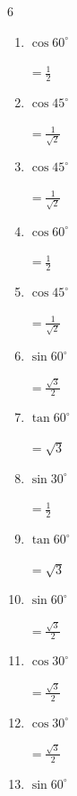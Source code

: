 \begin{multicols}{6}
\begin{enumerate}
        $\displaystyle =\frac{\sqrt{3}}{2}$

  \item $\displaystyle \cos{60^\circ}$

        $\displaystyle =\frac{1}{2}$

  \item $\displaystyle \cos{45^\circ}$

        $\displaystyle =\frac{1}{\sqrt{2}}$

  \item $\displaystyle \cos{45^\circ}$

        $\displaystyle =\frac{1}{\sqrt{2}}$

  \item $\displaystyle \cos{60^\circ}$

        $\displaystyle =\frac{1}{2}$

  \item $\displaystyle \cos{45^\circ}$

        $\displaystyle =\frac{1}{\sqrt{2}}$

  \item $\displaystyle \sin{60^\circ}$

        $\displaystyle =\frac{\sqrt{3}}{2}$

  \item $\displaystyle \tan{60^\circ}$

        $\displaystyle =\sqrt{3}$

  \item $\displaystyle \sin{30^\circ}$

        $\displaystyle =\frac{1}{2}$

  \item $\displaystyle \tan{60^\circ}$

        $\displaystyle =\sqrt{3}$

  \item $\displaystyle \sin{60^\circ}$

        $\displaystyle =\frac{\sqrt{3}}{2}$

  \item $\displaystyle \cos{30^\circ}$

        $\displaystyle =\frac{\sqrt{3}}{2}$

\columnbreak %

  \item $\displaystyle \cos{30^\circ}$

        $\displaystyle =\frac{\sqrt{3}}{2}$

  \item $\displaystyle \sin{60^\circ}$


\end{enumerate}
\end{multicols}
